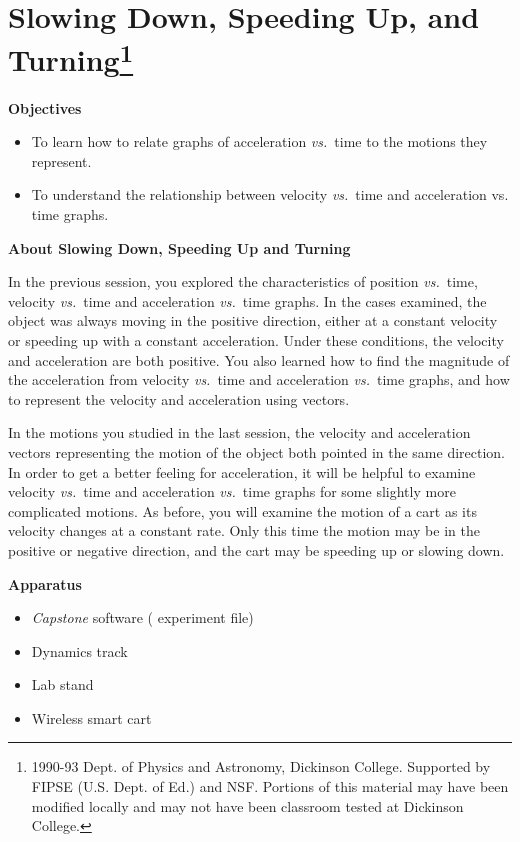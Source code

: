 
\section{Slowing Down, Speeding Up, and Turning\footnote{
1990-93 Dept. of Physics and Astronomy, Dickinson College. Supported by FIPSE
(U.S. Dept. of Ed.) and NSF. Portions of this material may have been modified
locally and may not have been classroom tested at Dickinson College.
}}

\makelabheader %

\medskip
\textbf{Objectives }

\begin{itemize}
\item To learn how to relate graphs of acceleration \textit{vs.}~time to the motions they represent. 
\item To understand the relationship between velocity \textit{vs.}~time and acceleration vs.
time graphs.
\end{itemize}

\medskip
\textbf{About Slowing Down, Speeding Up and Turning }

In the previous session, you explored the characteristics of position \textit{vs.}~time,
velocity \textit{vs.}~time and acceleration  \textit{vs.}~time graphs. In the cases examined, the object was always moving in the positive direction, either at a constant velocity or speeding up with a constant acceleration. Under these conditions, the velocity and acceleration are both positive. You also learned how to find the magnitude of the acceleration from velocity \textit{vs.}~time and acceleration \textit{vs.}~time graphs, and how to represent the velocity and acceleration using vectors. 

In the motions you studied in the last session, the velocity and acceleration
vectors representing the motion of the object both pointed in the same direction.
In order to get a better feeling for acceleration, it will be helpful to examine
velocity \textit{vs.}~time and acceleration \textit{vs.}~time graphs for some slightly more complicated motions. As before, you will examine the motion of a cart as its velocity changes at a constant rate. Only this time the motion may be in the positive or negative direction, and the cart may be speeding up or slowing down.

\medskip
\textbf{Apparatus }

\begin{itemize} 
\item \textit{Capstone} software ( experiment file)
\item Dynamics track 
\item Lab stand
\item Wireless smart cart
\end{itemize}

